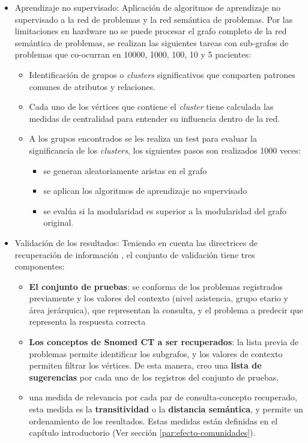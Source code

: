 \begin{itemize}
\item Aprendizaje no supervisado: Aplicación de algoritmos de aprendizaje no supervisado a la red de problemas y la red semántica de problemas. Por las limitaciones en hardware no se puede procesar el grafo completo de la red semántica de problemas, se realizan las siguientes tareas con sub-grafos de problemas que co-ocurran en \num{10000}, \num{1000}, \num{100}, \num{10} y \num{5} pacientes:
\begin{itemize}
    \item Identificación de grupos o \textit{clusters} significativos que comparten patrones comunes de atributos y relaciones. 
    \item Cada uno de los vértices que contiene el \textit{cluster} tiene calculada las medidas de centralidad para entender su influencia dentro de la red. 
    \item A los grupos encontrados se les realiza un test para evaluar la significancia de los \textit{clusters}, los siguientes pasos son realizados 1000 veces:
    \begin{itemize}
\item  se generan aleatoriamente aristas en el grafo
\item  se aplican los algoritmos de aprendizaje no supervisado
\item  se evalúa si la modularidad es superior a la modularidad del grafo original.
\end{itemize}
\end{itemize}

\item Validación de los resultados: 
\label{par:evaluacion-resultados}
Teniendo en cuenta las directrices de recuperación de información \cite{Manning2008,Hersh1994OHSUMED:Research}, el conjunto de validación tiene tres componentes: 

\begin{itemize}
\item \textbf{El conjunto de pruebas}: se conforma de los problemas registrados previamente y los valores del contexto (nivel asistencia, grupo etario y área jerárquica), que representan la consulta, y el problema a predecir que representa la respuesta correcta
\item \textbf{Los conceptos de Snomed CT a ser recuperados}: la lista previa de problemas permite identificar los subgrafos, y los valores de contexto permiten filtrar los vértices. De esta manera, creo una \textbf{lista de sugerencias} por cada uno de los registros del conjunto de pruebas.
\item una medida de relevancia por cada par de consulta-concepto recuperado, esta medida es la \textbf{transitividad} o la \textbf{distancia semántica}, y permite un ordenamiento de los resultados. Estas medidas están definidas en el capítulo introductorio (Ver sección \ref{par:efecto-comunidades}).
\end{itemize}


\end{itemize}
